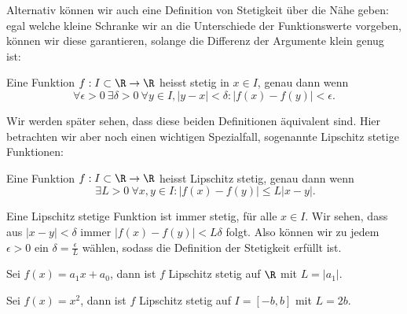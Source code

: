 \documentclass[letterpaper,10pt,english]{jupyterBook}
\begin{document}
Alternativ können wir auch eine Definition von Stetigkeit über die Nähe geben: egal welche kleine Schranke wir an die Unterschiede der Funktionswerte vorgeben, können wir diese garantieren, solange die Differenz der Argumente klein genug ist:
\label{vorkurs/stetigkeit:definition-1}
\begin{definition}{}{}



Eine Funktion \(f: I \subset \R \rightarrow \R\) heisst stetig in \(x \in I\), genau dann wenn
\begin{equation*}
 \forall \epsilon > 0~\exists \delta > 0 ~\forall y \in I, |y-x| < \delta: |f(x) - f(y)|<\epsilon.\end{equation*}\end{definition}

Wir werden später sehen, dass diese beiden Definitionen äquivalent sind. Hier betrachten wir aber noch einen wichtigen Spezialfall, sogenannte Lipschitz stetige Funktionen:
\label{vorkurs/stetigkeit:definition-2}
\begin{definition}{}{}



Eine Funktion \(f: I \subset \R \rightarrow \R\) heisst Lipschitz stetig, genau dann wenn
\begin{equation*}
 \ \exists L > 0 ~\forall x,y \in I: |f(x) - f(y)| \leq L |x-y|.
\end{equation*}\end{definition}

Eine Lipschitz stetige Funktion ist immer stetig, für alle \(x \in I\). Wir sehen, dass aus \(|x-y| < \delta\) immer \(|f(x) - f(y)| < L \delta\) folgt. Also können wir zu jedem \(\epsilon > 0\) ein \(\delta = \frac{\epsilon}{L}\) wählen, sodass die Definition der Stetigkeit erfüllt ist.
\label{vorkurs/stetigkeit:example-3}
\begin{example}{}{}



Sei \(f(x) = a_1 x + a_0\), dann ist \(f\) Lipschitz stetig auf \(\R\) mit \(L=\vert a_1 \vert\).
\end{example}
\label{vorkurs/stetigkeit:example-4}
\begin{example}{}{}



Sei \(f(x) = x^2\), dann ist \(f\) Lipschitz stetig auf \(I=[-b,b]\) mit \(L= 2b\).
\end{example}
\end{document}
